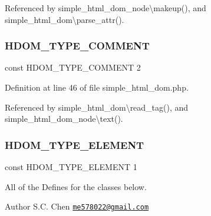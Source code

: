 Referenced by simple\+\_\+html\+\_\+dom\+\_\+node\textbackslash{}makeup(), and simple\+\_\+html\+\_\+dom\textbackslash{}parse\+\_\+attr().

\hypertarget{simple__html__dom_8php_ae045af0527e4d0ebd351cbd0b0ff8124}{}\label{simple__html__dom_8php_ae045af0527e4d0ebd351cbd0b0ff8124} 
\subsubsection{\texorpdfstring{H\+D\+O\+M\+\_\+\+T\+Y\+P\+E\+\_\+\+C\+O\+M\+M\+E\+NT}{HDOM\_TYPE\_COMMENT}}
{\footnotesize\ttfamily const H\+D\+O\+M\+\_\+\+T\+Y\+P\+E\+\_\+\+C\+O\+M\+M\+E\+NT 2}



Definition at line 46 of file simple\+\_\+html\+\_\+dom.\+php.



Referenced by simple\+\_\+html\+\_\+dom\textbackslash{}read\+\_\+tag(), and simple\+\_\+html\+\_\+dom\+\_\+node\textbackslash{}text().

\hypertarget{simple__html__dom_8php_a3436a40c141ec78cc95c71f59f993087}{}\label{simple__html__dom_8php_a3436a40c141ec78cc95c71f59f993087} 
\subsubsection{\texorpdfstring{H\+D\+O\+M\+\_\+\+T\+Y\+P\+E\+\_\+\+E\+L\+E\+M\+E\+NT}{HDOM\_TYPE\_ELEMENT}}
{\footnotesize\ttfamily const H\+D\+O\+M\+\_\+\+T\+Y\+P\+E\+\_\+\+E\+L\+E\+M\+E\+NT 1}

All of the Defines for the classes below. \begin{DoxyAuthor}{Author}
S.\+C. Chen \href{mailto:me578022@gmail.com}{\tt me578022@gmail.\+com} 
\end{DoxyAuthor}


